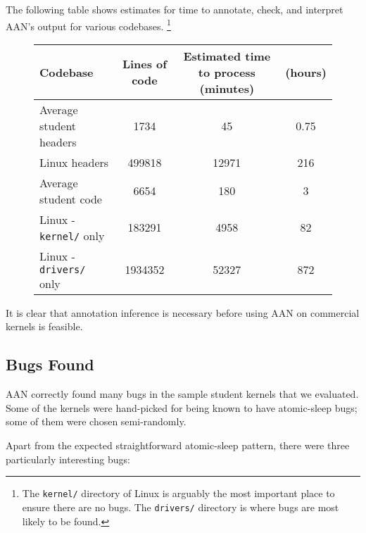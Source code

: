 \documentclass{article}
\begin{document}
The following table shows estimates for time to annotate, check, and interpret AAN's output for various codebases.
\footnote{The \texttt{kernel/} directory of Linux is arguably the most important place to ensure there are no bugs. The \texttt{drivers/} directory is where bugs are most likely to be found.}

\begin{figure}[h]
\begin{tabular}{l|c|c|c}
	Codebase & Lines of code & Estimated time to process (minutes) & (hours) \\
	\hline
	Average student headers & 1734 & 45 & 0.75 \\
	Linux headers & 499818 & 12971 & 216 \\
	Average student code & 6654 & 180 & 3 \\
	Linux - \texttt{kernel/} only & 183291 & 4958 & 82 \\
	Linux - \texttt{drivers/} only & 1934352 & 52327 & 872 \\
\end{tabular}
\end{figure}

It is clear that annotation inference is necessary before using AAN on commercial kernels is feasible.

\subsection{Bugs Found}

AAN correctly found many bugs in the sample student kernels that we evaluated. Some of the kernels were hand-picked for being known to have atomic-sleep bugs; some of them were chosen semi-randomly.

Apart from the expected straightforward atomic-sleep pattern, there were three particularly interesting bugs:
\end{document}
